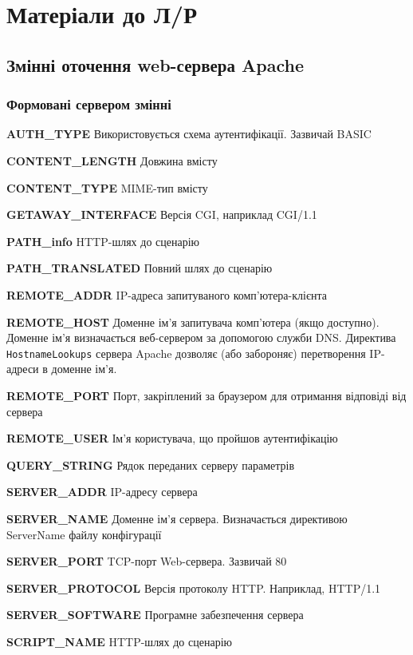 \chapter{Матеріали до Л/Р }

\section{Змінні оточення web-сервера Apache}
\label{var-apa:app}
\nopagebreak[4]
\subsection{Формовані сервером змінні}

\textbf{AUTH\_TYPE} Використовується схема аутентифікації. Зазвичай BASIC

\textbf{CONTENT\_LENGTH} Довжина вмісту

\textbf{CONTENT\_TYPE} MIME-тип вмісту

\textbf{GETAWAY\_INTERFACE} Версія CGI, наприклад CGI/1.1

\textbf{PATH\_info} HTTP-шлях до сценарію

\textbf{PATH\_TRANSLATED} Повний шлях до сценарію

\textbf{REMOTE\_ADDR} IP-адреса запитуваного комп'ютера-клієнта

\textbf{REMOTE\_HOST} Доменне ім'я запитувача комп'ютера (якщо доступно). Доменне ім'я визначається веб-сервером за допомогою служби DNS. Директива \verb'HostnameLookups' сервера Apache дозволяє (або забороняє) перетворення IP-адреси в доменне ім'я.

\textbf{REMOTE\_PORT} Порт, закріплений за браузером для отримання відповіді від сервера

\textbf{REMOTE\_USER} Ім'я користувача, що пройшов аутентифікацію

\textbf{QUERY\_STRING} Рядок переданих серверу параметрів

\textbf{SERVER\_ADDR} IP-адресу сервера

\textbf{SERVER\_NAME} Доменне ім'я сервера. Визначається директивою ServerName файлу конфігурації

\textbf{SERVER\_PORT} TCP-порт Web-сервера. Зазвичай 80

\textbf{SERVER\_PROTOCOL} Версія протоколу HTTP. Наприклад, HTTP/1.1

\textbf{SERVER\_SOFTWARE} Програмне забезпечення сервера

\textbf{SCRIPT\_NAME} HTTP-шлях до сценарію

